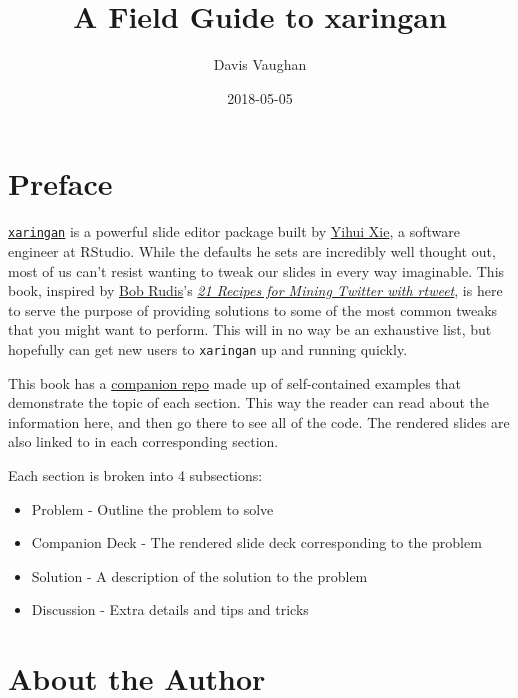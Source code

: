 \documentclass[]{book}
\title{A Field Guide to xaringan}
\author{Davis Vaughan}
\date{2018-05-05}
\providecommand{\tightlist}{%
  \setlength{\itemsep}{0pt}\setlength{\parskip}{0pt}}
\theoremstyle{definition}
\theoremstyle{definition}
\theoremstyle{definition}
\theoremstyle{remark}
\begin{document}
\maketitle

{
\setcounter{tocdepth}{1}
\tableofcontents
}
\hypertarget{preface}{%
\chapter*{Preface}\label{preface}}

\href{https://github.com/yihui/xaringan}{\texttt{xaringan}} is a
powerful slide editor package built by
\href{https://github.com/yihui}{Yihui Xie}, a software engineer at
RStudio. While the defaults he sets are incredibly well thought out,
most of us can't resist wanting to tweak our slides in every way
imaginable. This book, inspired by
\href{https://twitter.com/hrbrmstr}{Bob Rudis}'s
\href{https://rud.is/books/21-recipes/index.html}{\emph{21 Recipes for
Mining Twitter with rtweet}}, is here to serve the purpose of providing
solutions to some of the most common tweaks that you might want to
perform. This will in no way be an exhaustive list, but hopefully can
get new users to \texttt{xaringan} up and running quickly.

This book has a
\href{https://github.com/DavisVaughan/xaringanrecipes-companion}{companion
repo} made up of self-contained examples that demonstrate the topic of
each section. This way the reader can read about the information here,
and then go there to see all of the code. The rendered slides are also
linked to in each corresponding section.

Each section is broken into 4 subsections:

\begin{itemize}
\tightlist
\item
  Problem - Outline the problem to solve
\item
  Companion Deck - The rendered slide deck corresponding to the problem
\item
  Solution - A description of the solution to the problem
\item
  Discussion - Extra details and tips and tricks
\end{itemize}

\hypertarget{about-the-author}{%
\chapter*{About the Author}\label{about-the-author}}
\end{document}
